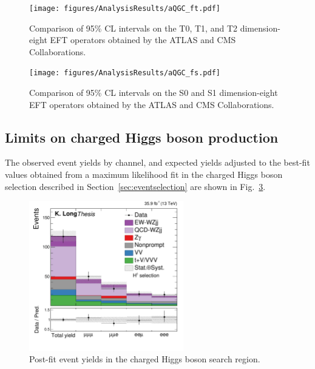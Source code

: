 \begin{figure}[htbp]
  \centering
   \texttt{[image: figures/AnalysisResults/aQGC\_ft.pdf]}
  \caption[Comparison of experimental constraints on the T0, T1, and T2 EFT operators]
  {
    Comparison of 95\% CL intervals on the T0, T1, and T2 dimension-eight EFT operators 
    obtained by the ATLAS and CMS Collaborations. 
 }
 \label{fig:aQGCCompareFT}
\end{figure}

\begin{figure}[htbp]
  \centering
   \texttt{[image: figures/AnalysisResults/aQGC\_fs.pdf]}
  \caption[Comparison of experimental constraints on the S0 and S1 dimension-eight EFT operators]
  {
    Comparison of 95\% CL intervals on the S0 and S1 dimension-eight EFT operators 
    obtained by the ATLAS and CMS Collaborations. 
 }
 \label{fig:aQGCCompareFS}
\end{figure}

\subsection{Limits on charged Higgs boson production}

The observed event yields by channel, and expected yields adjusted to the
best-fit values obtained from a maximum likelihood fit in the charged Higgs
boson selection described in Section~\ref{sec:eventselection} 
are shown in Fig.~\ref{fig:higgsSignalYields}.

\begin{figure}[htbp]
  \centering
   \includegraphics[width=0.6\textwidth]{figures/AnalysisResults/yieldByChannel_Higgs.pdf}
  \caption{
    Post-fit event yields in the charged Higgs boson search region.
          }
 \label{fig:higgsSignalYields}
\end{figure}

